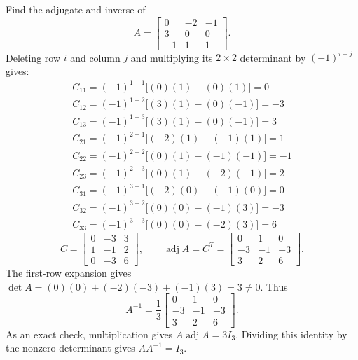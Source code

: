 \goal Find the adjugate and inverse of
\[A=\begin{bmatrix}0&-2&-1\\3&0&0\\-1&1&1\end{bmatrix}.\]
Deleting row $i$ and column $j$ and multiplying its $2\times2$ determinant by $(-1)^{i+j}$ gives:
\[\begin{gathered}
C_{11}=(-1)^{1+1}\big[(0)(1)-(0)(1)\big]=0\\C_{12}=(-1)^{1+2}\big[(3)(1)-(0)(-1)\big]=-3\\C_{13}=(-1)^{1+3}\big[(3)(1)-(0)(-1)\big]=3\\C_{21}=(-1)^{2+1}\big[(-2)(1)-(-1)(1)\big]=1\\C_{22}=(-1)^{2+2}\big[(0)(1)-(-1)(-1)\big]=-1\\C_{23}=(-1)^{2+3}\big[(0)(1)-(-2)(-1)\big]=2\\C_{31}=(-1)^{3+1}\big[(-2)(0)-(-1)(0)\big]=0\\C_{32}=(-1)^{3+2}\big[(0)(0)-(-1)(3)\big]=-3\\C_{33}=(-1)^{3+3}\big[(0)(0)-(-2)(3)\big]=6
\end{gathered}\]
\[C=\begin{bmatrix}0&-3&3\\1&-1&2\\0&-3&6\end{bmatrix},\qquad\operatorname{adj}A=C^T=\begin{bmatrix}0&1&0\\-3&-1&-3\\3&2&6\end{bmatrix}.\]
The first-row expansion gives $\det A=(0)(0) + (-2)(-3) + (-1)(3)=3\ne0$. Thus
\[A^{-1}=\frac{1}{3}\begin{bmatrix}0&1&0\\-3&-1&-3\\3&2&6\end{bmatrix}.\]
As an exact check, multiplication gives $A\operatorname{adj}A=3I_3$. Dividing this identity by the nonzero determinant gives $AA^{-1}=I_3$.



